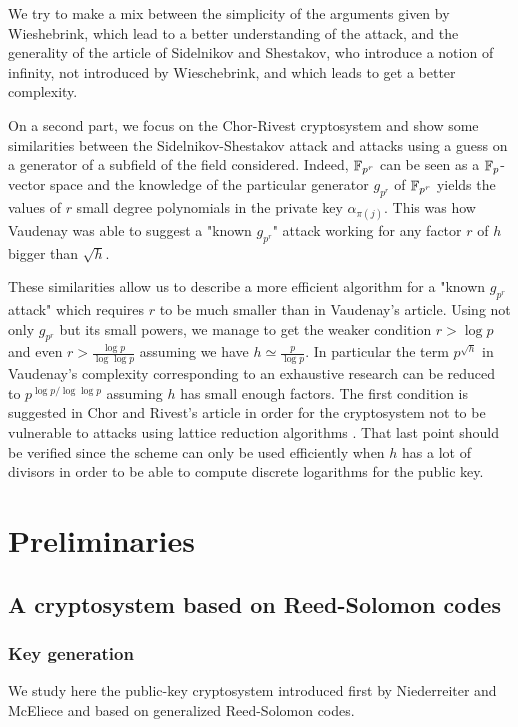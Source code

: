 \documentclass[a4paper]{article}
\begin{document}
We try to make a mix between the simplicity of the arguments given by Wieshebrink, which lead to a better understanding of the attack, and the generality of the article of Sidelnikov and Shestakov, who introduce a notion of infinity,
not introduced by Wieschebrink, and which leads to get a better complexity.


On a second part, we focus on the Chor-Rivest cryptosystem and show some similarities between the Sidelnikov-Shestakov attack and attacks using a guess on a generator of a subfield of the field considered. Indeed, $\mathbb{F}_{p^r}$ can be seen as a $\mathbb{F}_p$-vector space and the knowledge of the particular generator $g_{p^r}$ of $\mathbb{F}_{p^r}$ yields the values of $r$ small degree polynomials in the private key $\alpha_{\pi(j)}$. This was how Vaudenay was able to suggest a "known $g_{p^r}$" attack working for any factor $r$ of $h$ bigger than $\sqrt{h}$.

These similarities allow us to describe a more efficient algorithm for a "known $g_{p^r}$ attack" which requires $r$ to be much smaller than in Vaudenay's article. Using not only $g_{p^r}$ but its small powers, we manage to get the weaker condition $r > \log p$ and even $r > \frac{\log p}{\log \log p}$ assuming we have $h \simeq \frac{p}{\log p}$. In particular the term $p^{\sqrt{h}}$ in Vaudenay's complexity corresponding to an exhaustive research can be reduced to $p^{\log p / \log \log p}$ assuming $h$ has small enough factors. The first condition is suggested in Chor and Rivest's article in order for the cryptosystem not to be vulnerable to attacks using lattice reduction algorithms . That last point should be verified since the scheme can only be used efficiently when $h$ has a lot of divisors in order to be able to compute discrete logarithms for the public key.




\section{Preliminaries}
\label{sec:Prel}


\subsection{A cryptosystem based on Reed-Solomon codes}
\subsubsection{Key generation}

We study here the public-key cryptosystem introduced first by Niederreiter and McEliece \cite{NiederH86} and based on generalized Reed-Solomon codes.
\end{document}
